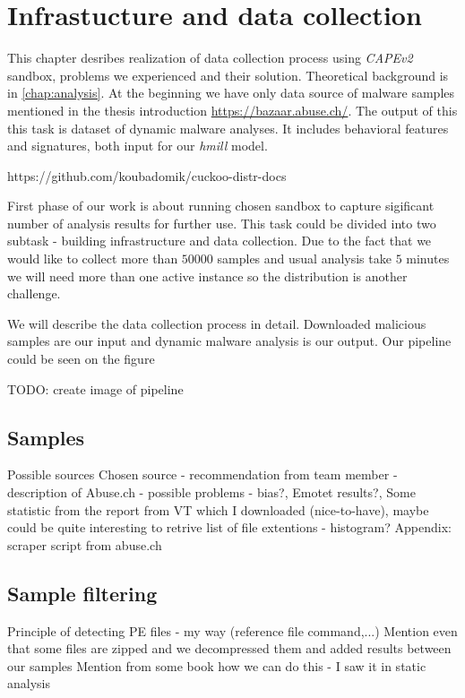 \chapter{Infrastucture and data collection} \label{chap:infrastructure}
This chapter desribes realization of data collection process using \emph{CAPEv2} sandbox, problems we experienced and their solution. Theoretical background is in \ref{chap:analysis}. At the beginning we have only data source of malware samples mentioned in the thesis introduction \url{https://bazaar.abuse.ch/}. The output of this this task is dataset of dynamic malware analyses. It includes behavioral features and signatures, both input for our \emph{hmill} model.




https://github.com/koubadomik/cuckoo-distr-docs

First phase of our work is about running chosen sandbox to capture sigificant number of analysis results for further use. This task could be divided into two subtask - building infrastructure and data collection. Due to the fact that we would like to collect more than $50 000$ samples and usual analysis take $5$ minutes we will need more than one active instance so the distribution is another challenge.

We will describe the data collection process in detail. Downloaded malicious samples are our input and dynamic malware analysis is our output. Our pipeline could be seen on the figure 



TODO: create image of pipeline 

\section{Samples}
Possible sources
Chosen source
- recommendation from team member
- description of Abuse.ch
- possible problems - bias?, Emotet results?, Some statistic from the report from VT which I downloaded (nice-to-have), maybe could be quite interesting to retrive list of file extentions - histogram?
Appendix: scraper script from abuse.ch
\section{Sample filtering}
Principle of detecting PE files - my way (reference file command,...)
Mention even that some files are zipped and we decompressed them and added results between our samples
Mention from some book how we can do this - I saw it in static analysis

